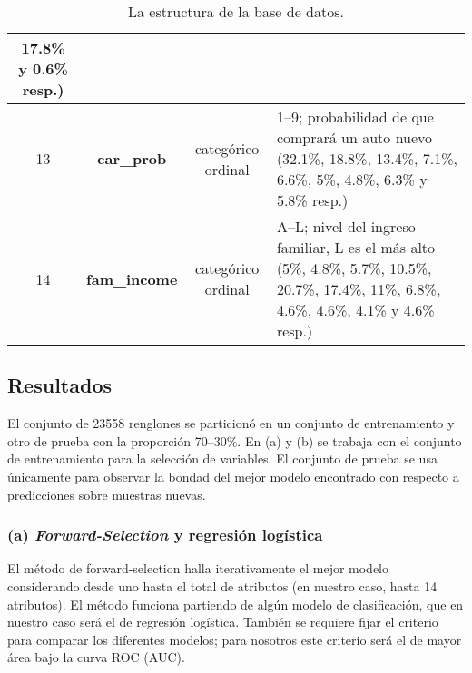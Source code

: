 \documentclass[letterpaper,11pt]{article}
\begin{document}
\begin{table}
\begin{center}
{\begin{tabular}{|c|c|c|p{10cm}|}
{    17.8\% y 0.6\% resp.)}\\
    \hline 
    13 &\bf car\_prob & categórico ordinal & 1--9; probabilidad de que comprará un auto nuevo {\footnotesize (32.1\%,
    18.8\%, 13.4\%, 7.1\%, 6.6\%, 5\%, 4.8\%, 6.3\% y 5.8\% resp.)}\\
    \hline 
    14 &\bf fam\_income & categórico ordinal & A--L; nivel del ingreso familiar, L es el más alto {\footnotesize (5\%,
    4.8\%, 5.7\%, 10.5\%, 20.7\%, 17.4\%, 11\%, 6.8\%, 4.6\%, 4.6\%, 4.1\% y 4.6\% resp.)}\\
    \hline
\end{tabular}}
\end{center}
\caption{\small La estructura de la base de datos.}
\label{tab:1}
\end{table}

\begin{multicols}{2}
\section{Resultados}
El conjunto de 23558 renglones se particionó en un conjunto de entrenamiento y otro de prueba con la
proporción 70--30\%. En (a) y (b) se trabaja con el conjunto de entrenamiento para la selección de variables. El
conjunto de prueba se usa únicamente para observar la bondad del mejor modelo encontrado con respecto a predicciones
sobre muestras nuevas. 
\subsubsection*{(a) \emph{Forward-Selection} y regresión logística}
El método de forward-selection\cite{book1} halla iterativamente el mejor modelo considerando desde uno hasta el total de atributos
(en nuestro caso, hasta 14 atributos). El método funciona partiendo de algún
modelo de clasificación, que en nuestro caso será el de regresión logística. También se requiere fijar el criterio
para comparar los diferentes modelos; para nosotros este criterio será el de mayor área bajo la curva ROC (AUC). 


\end{multicols}
\end{document}
